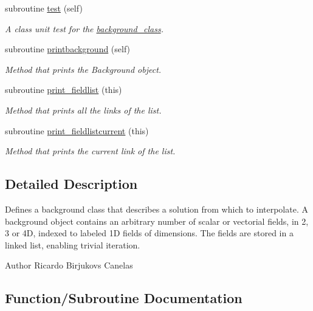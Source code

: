 \begin{DoxyCompactItemize}
subroutine \mbox{\hyperlink{namespacebackground__mod_a3cee95b9b5d3aae83df33334981f2b27}{test}} (self)
\begin{DoxyCompactList}\small\item\em A class \textquotesingle{}unit\textquotesingle{} test for the \mbox{\hyperlink{structbackground__mod_1_1background__class}{background\+\_\+class}}. \end{DoxyCompactList}\item 
subroutine \mbox{\hyperlink{namespacebackground__mod_a8a8f225cffcddb742f22a402155b703f}{printbackground}} (self)
\begin{DoxyCompactList}\small\item\em Method that prints the Background object. \end{DoxyCompactList}\item 
subroutine \mbox{\hyperlink{namespacebackground__mod_acdcc52b4fb298bc145a121f9e8a4b929}{print\+\_\+fieldlist}} (this)
\begin{DoxyCompactList}\small\item\em Method that prints all the links of the list. \end{DoxyCompactList}\item 
subroutine \mbox{\hyperlink{namespacebackground__mod_a2bd18f3830c0667741efd086d36753db}{print\+\_\+fieldlistcurrent}} (this)
\begin{DoxyCompactList}\small\item\em Method that prints the current link of the list. \end{DoxyCompactList}\end{DoxyCompactItemize}


\subsection{Detailed Description}
Defines a background class that describes a solution from which to interpolate. A background object contains an arbitrary number of scalar or vectorial fields, in 2, 3 or 4D, indexed to labeled 1D fields of dimensions. The fields are stored in a linked list, enabling trivial iteration. 

\begin{DoxyAuthor}{Author}
Ricardo Birjukovs Canelas 
\end{DoxyAuthor}


\subsection{Function/\+Subroutine Documentation}
\mbox{\label{namespacebackground__mod_aa6ddc308698724f00ce1177ded5afc4c}} 
